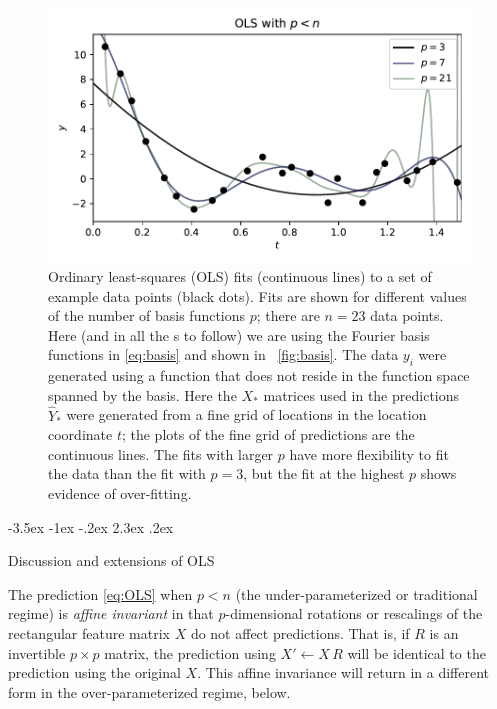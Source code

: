 \documentclass[12pt,letterpaper]{article}
\makeatletter
\newlength{\figurewidth}
\renewcommand\section{\@startsection {section}{1}{\z@}%
  {-3.5ex \@plus -1ex \@minus -.2ex}%
  {2.3ex \@plus.2ex}%
  {\raggedright\normalfont\Large\bfseries}}
\makeatother
\begin{document}
\begin{figure}[t]
    \begin{mdframed}
    \includegraphics[width=\figurewidth]{paper/OLS-under.pdf}
    \caption{Ordinary least-squares (OLS) fits (continuous lines) to a set of example data points (black dots). Fits are shown for different values of the number of basis functions $p$; there are $n=23$ data points. Here (and in all the \figurename s to follow) we are using the Fourier basis functions in \eqref{eq:basis} and shown in \figurename~\ref{fig:basis}. The data $y_i$ were generated using a function that does not reside in the function space spanned by the basis. Here the $X_\ast$ matrices used in the predictions $\hat{Y}_\ast$ were generated from a fine grid of locations in the location coordinate $t$; the plots of the fine grid of predictions are the continuous lines. The fits with larger $p$ have more flexibility to fit the data than the fit with $p=3$, but the fit at the highest $p$ shows evidence of over-fitting.}
    \label{fig:ols1}
    \end{mdframed}
\end{figure}

\section{Discussion and extensions of OLS}\label{sec:extensions}

The prediction \eqref{eq:OLS} when $p<n$ (the under-parameterized or traditional regime) is \emph{affine invariant} in that $p$-dimensional rotations or rescalings of the rectangular feature matrix $X$ do not affect predictions.
That is, if $R$ is an invertible $p\times p$ matrix, the prediction using $X'\leftarrow X\,R$ will be identical to the prediction using the original $X$.
This affine invariance will return in a different form in the over-parameterized regime, below.
\end{document}
